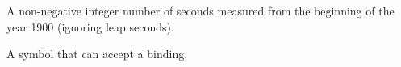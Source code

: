 \begin{glossary-list}

%
%
A non-negative integer number of seconds measured from the beginning of the
year 1900 (ignoring leap seconds).


%
%
A symbol that can accept a binding.

\end{glossary-list}

